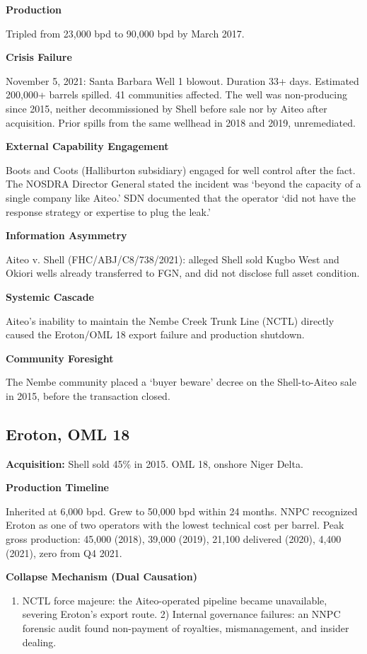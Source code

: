 \documentclass[twoside,fontset=lmodern]{mitthesis}
\providecommand{\tightlist}{\setlength{\itemsep}{0pt}\setlength{\parskip}{0pt}}
\begin{document}
\textbf{Production}

Tripled from 23,000 bpd to 90,000 bpd by March 2017.

\textbf{Crisis Failure}

November 5, 2021: Santa Barbara Well 1 blowout. Duration 33+ days.
Estimated 200,000+ barrels spilled. 41 communities affected. The well
was non-producing since 2015, neither decommissioned by Shell before
sale nor by Aiteo after acquisition. Prior spills from the same wellhead
in 2018 and 2019, unremediated.

\textbf{External Capability Engagement}

Boots and Coots (Halliburton subsidiary) engaged for well control after
the fact. The NOSDRA Director General stated the incident was `beyond
the capacity of a single company like Aiteo.' SDN documented that the
operator `did not have the response strategy or expertise to plug the
leak.'

\textbf{Information Asymmetry}

Aiteo v. Shell (FHC/ABJ/C8/738/2021): alleged Shell sold Kugbo West and
Okiori wells already transferred to FGN, and did not disclose full asset
condition.

\textbf{Systemic Cascade}

Aiteo's inability to maintain the Nembe Creek Trunk Line (NCTL) directly
caused the Eroton/OML 18 export failure and production shutdown.

\textbf{Community Foresight}

The Nembe community placed a `buyer beware' decree on the Shell-to-Aiteo
sale in 2015, before the transaction closed.

\hypertarget{eroton-oml-18}{%
\subsection{Eroton, OML 18}\label{eroton-oml-18}}

\textbf{Acquisition:} Shell sold 45\% in 2015. OML 18, onshore Niger
Delta.

\textbf{Production Timeline}

Inherited at 6,000 bpd. Grew to 50,000 bpd within 24 months. NNPC
recognized Eroton as one of two operators with the lowest technical cost
per barrel. Peak gross production: 45,000 (2018), 39,000 (2019), 21,100
delivered (2020), 4,400 (2021), zero from Q4 2021.

\textbf{Collapse Mechanism (Dual Causation)}

\begin{enumerate}
\def\labelenumi{\arabic{enumi})}
\tightlist
\item
  NCTL force majeure: the Aiteo-operated pipeline became unavailable,
  severing Eroton's export route. 2) Internal governance failures: an
  NNPC forensic audit found non-payment of royalties, mismanagement, and
  insider dealing.
\end{enumerate}
\end{document}

